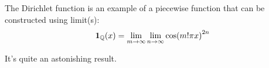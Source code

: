 \begin{theorem}
    The Dirichlet function is an example of a piecewise function that can be constructed using limit(s):
    $$
        \mathbf{1}_{\mathbb{Q}}(x)=\lim_{m\to\infty}{\lim_{n\to\infty}{\cos(m!\pi x)^{2n}}}
    $$

    It's quite an astonishing result.
\end{theorem}

\newpage